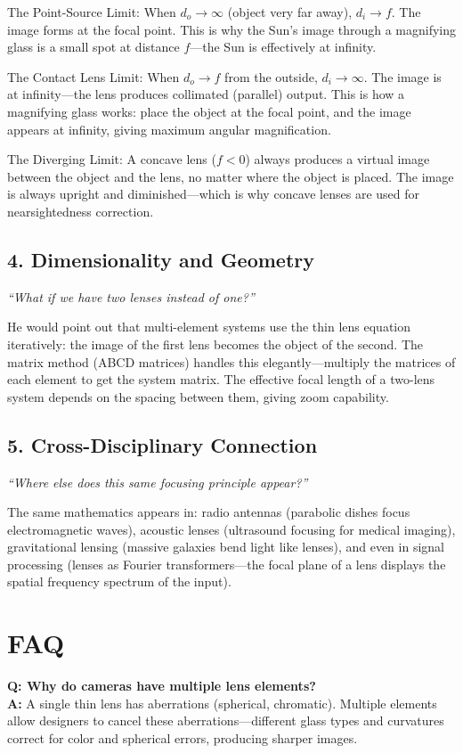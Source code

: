 \documentclass[11pt,openright]{book}
\begin{document}
The Point-Source Limit: When $d_o \to \infty$ (object very far away), $d_i \to f$. The image forms at the focal point. This is why the Sun's image through a magnifying glass is a small spot at distance $f$---the Sun is effectively at infinity.

The Contact Lens Limit: When $d_o \to f$ from the outside, $d_i \to \infty$. The image is at infinity---the lens produces collimated (parallel) output. This is how a magnifying glass works: place the object at the focal point, and the image appears at infinity, giving maximum angular magnification.

The Diverging Limit: A concave lens ($f < 0$) always produces a virtual image between the object and the lens, no matter where the object is placed. The image is always upright and diminished---which is why concave lenses are used for nearsightedness correction.

\subsection*{4. Dimensionality and Geometry}
\textit{``What if we have two lenses instead of one?''}

He would point out that multi-element systems use the thin lens equation iteratively: the image of the first lens becomes the object of the second. The matrix method (ABCD matrices) handles this elegantly---multiply the matrices of each element to get the system matrix. The effective focal length of a two-lens system depends on the spacing between them, giving zoom capability.

\subsection*{5. Cross-Disciplinary Connection}
\textit{``Where else does this same focusing principle appear?''}

The same mathematics appears in: radio antennas (parabolic dishes focus electromagnetic waves), acoustic lenses (ultrasound focusing for medical imaging), gravitational lensing (massive galaxies bend light like lenses), and even in signal processing (lenses as Fourier transformers---the focal plane of a lens displays the spatial frequency spectrum of the input).
\section*{FAQ}

\textbf{Q: Why do cameras have multiple lens elements?}\\
\textbf{A:} A single thin lens has aberrations (spherical, chromatic). Multiple elements allow designers to cancel these aberrations---different glass types and curvatures correct for color and spherical errors, producing sharper images.
\end{document}
